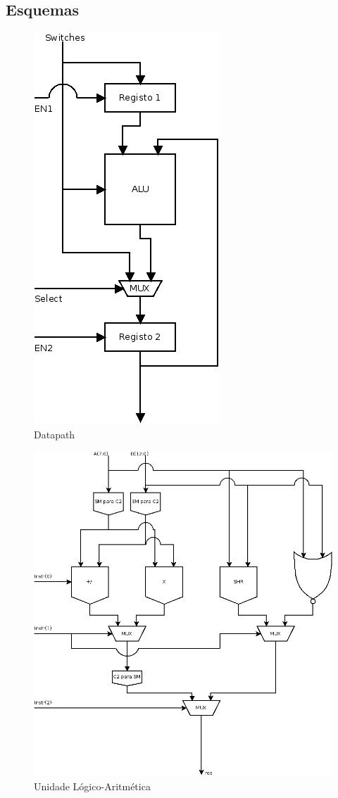 \documentclass[a4paper]{article}
\begin{document}
\subsection{Esquemas}
\begin{figure}[H]
	\centering
	\includegraphics[scale=0.25]{DP}
	\caption{Datapath}
	\label{fig:DPdiagram}
\end{figure}
\begin{figure}[H]
	\centering
	\includegraphics[scale=0.24]{ALU}
	\caption{Unidade Lógico-Aritmética}
	\label{fig:ALUdiagram}
\end{figure}
\pagebreak
\end{document}
